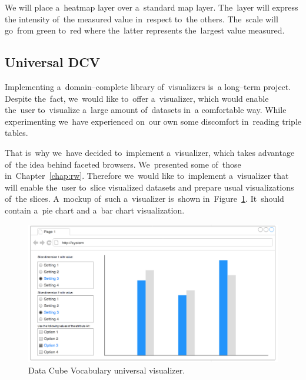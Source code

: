 We will place a~heatmap layer over a~standard map layer. The~layer will express 
the intensity of~the measured value in~respect to~the others. The~scale will go~from 
green to~red where the~latter represents the~largest value measured.

\subsection{Universal DCV}
Implementing a~domain--complete library of~visualizers is~a long--term project. 
Despite the~fact, we~would like to~offer a~visualizer, which would enable the~user to~visualize a~large amount of~datasets in~a comfortable way. While
experimenting we~have experienced on~our own some discomfort in~reading triple tables.

That is~why we~have decided to~implement a~visualizer, which takes advantage of~the idea behind faceted browsers. We~presented some of~those in~Chapter~\ref{chap:rw}. Therefore we~would like to~implement a~visualizer that will 
enable the~user to~slice visualized datasets and prepare usual visualizations of~the slices. A~mockup of~such a~visualizer is~shown in~Figure~\ref{fig:dcv-universal}. It~should contain a~pie chart and a~bar chart 
visualization.

\begin{figure}
	\centering
	\includegraphics[width=140mm]{img/dcv-universal.png}
	\caption{Data Cube Vocabulary universal visualizer.}
	\label{fig:dcv-universal}
\end{figure}



